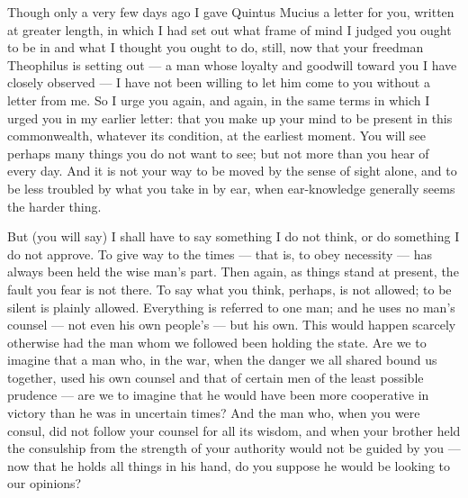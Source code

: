 

 Though only a very few days ago I gave Quintus Mucius a letter for you, written at greater length, in which I had set out what frame of mind I judged you ought to be in and what I thought you ought to do, still, now that your freedman Theophilus is setting out --- a man whose loyalty and goodwill toward you I have closely observed --- I have not been willing to let him come to you without a letter from me. So I urge you again, and again, in the same terms in which I urged you in my earlier letter: that you make up your mind to be present in this commonwealth, whatever its condition, at the earliest moment. You will see perhaps many things you do not want to see; but not more than you hear of every day. And it is not your way to be moved by the sense of sight alone, and to be less troubled by what you take in by ear, when ear-knowledge generally seems the harder thing.

 But (you will say) I shall have to say something I do not think, or do something I do not approve. To give way to the times --- that is, to obey necessity --- has always been held the wise man's part. Then again, as things stand at present, the fault you fear is not there. To say what you think, perhaps, is not allowed; to be silent is plainly allowed. Everything is referred to one man; and he uses no man's counsel --- not even his own people's --- but his own. This would happen scarcely otherwise had the man whom we followed been holding the state. Are we to imagine that a man who, in the war, when the danger we all shared bound us together, used his own counsel and that of certain men of the least possible prudence --- are we to imagine that he would have been more cooperative in victory than he was in uncertain times? And the man who, when you were consul, did not follow your counsel for all its wisdom, and when your brother held the consulship from the strength of your authority would not be guided by you --- now that he holds all things in his hand, do you suppose he would be looking to our opinions?

